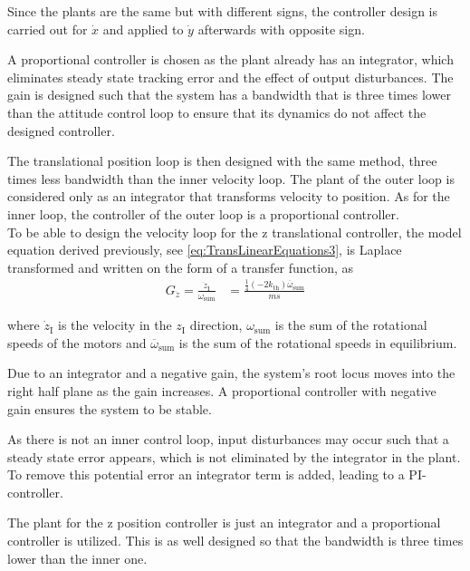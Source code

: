 Since the plants are the same but with different signs, the controller design is carried out for $\dot{x}$ and applied to $\dot{y}$ afterwards with opposite sign.

A proportional controller is chosen as the plant already has an integrator, which eliminates steady state tracking error and the effect of output disturbances. The gain is designed such that the system has a bandwidth that is three times lower than the attitude control loop to ensure that its dynamics do not affect the designed controller. %

The translational position loop is then designed with the same method, three times less bandwidth than the inner velocity loop. The plant of the outer loop is considered only as an integrator that transforms velocity to position. As for the inner loop, the controller of the outer loop is a proportional controller. \\

To be able to design the velocity loop for the z translational controller, the model equation derived previously, see \eqref{eq:TransLinearEquations3}, is Laplace transformed and written on the form of a transfer function, as
%
\vspace{-.1cm}
\begin{align}
G_{\dot{z}}=\frac{\dot{z}_{\mathrm{I}}}{\omega_{\mathrm{sum}}} &= \frac{ \frac{1}{4}(-2 k_{\mathrm{th}})\overline{\omega}_{\mathrm{sum}} }{ m s }\label{eq:linearTransferFunctionZ}
\end{align}

\noindent where $\dot{z}_\mathrm{I}$ is the velocity in the $z_{\mathrm{I}}$ direction, $\omega_{\mathrm{sum}}$ is the sum of the rotational speeds of the motors and $\overline{\omega}_{\mathrm{sum}}$ is the sum of the rotational speeds in equilibrium.

Due to an integrator and a negative gain, the system's root locus moves into the right half plane as the gain increases. A proportional controller with negative gain ensures the system to be stable. 

As there is not an inner control loop, input disturbances may occur such that a steady state error appears, which is not eliminated by the integrator in the plant. To remove this potential error an integrator term is added, leading to a PI-controller. 

The plant for the z position controller is just an integrator and a proportional controller is utilized. This is as well designed so that the bandwidth is three times lower than the inner one.
